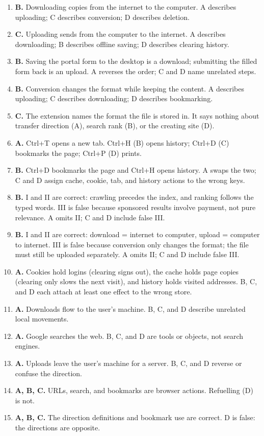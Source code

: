 \documentclass[11pt]{article}
\begin{document}
\begin{enumerate}[label=\textbf{Q\arabic*.}, leftmargin=*]
\item \textbf{B.} Downloading copies from the internet to the computer.
  A describes uploading; C describes conversion; D describes deletion.
\item \textbf{C.} Uploading sends from the computer to the internet.
  A describes downloading; B describes offline saving; D describes clearing
  history.
\item \textbf{B.} Saving the portal form to the desktop is a download;
  submitting the filled form back is an upload. A reverses the order; C and
  D name unrelated steps.
\item \textbf{B.} Conversion changes the format while keeping the content.
  A describes uploading; C describes downloading; D describes bookmarking.
\item \textbf{C.} The extension names the format the file is stored in.
  It says nothing about transfer direction (A), search rank (B), or the
  creating site (D).
\item \textbf{A.} Ctrl+T opens a new tab. Ctrl+H (B) opens history; Ctrl+D
  (C) bookmarks the page; Ctrl+P (D) prints.
\item \textbf{B.} Ctrl+D bookmarks the page and Ctrl+H opens history. A
  swaps the two; C and D assign cache, cookie, tab, and history actions to
  the wrong keys.
\item \textbf{B.} I and II are correct: crawling precedes the index, and
  ranking follows the typed words. III is false because sponsored results
  involve payment, not pure relevance. A omits II; C and D include false III.
\item \textbf{B.} I and II are correct: download = internet to computer,
  upload = computer to internet. III is false because conversion only
  changes the format; the file must still be uploaded separately. A omits
  II; C and D include false III.
\item \textbf{A.} Cookies hold logins (clearing signs out), the cache holds
  page copies (clearing only slows the next visit), and history holds visited
  addresses. B, C, and D each attach at least one effect to the wrong store.

\item \textbf{A.} Downloads flow to the user's machine. B, C, and D describe unrelated local movements.
\item \textbf{A.} Google searches the web. B, C, and D are tools or objects, not search engines.
\item \textbf{A.} Uploads leave the user's machine for a server. B, C, and D reverse or confuse the direction.
\item \textbf{A, B, C.} URLs, search, and bookmarks are browser actions. Refuelling (D) is not.
\item \textbf{A, B, C.} The direction definitions and bookmark use are correct. D is false: the directions are opposite.
\end{enumerate}
\def\JKSSBLessonID{36}\def\JKSSBAnswers{1}
\end{document}
